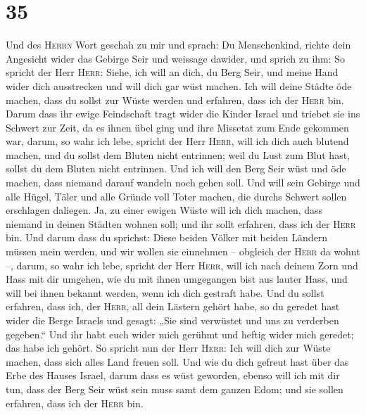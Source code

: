 \hypertarget{section-34}{%
\section{35}\label{section-34}}

 Und des \textsc{Herrn} Wort geschah zu mir und sprach:
 Du Menschenkind, richte dein Angesicht wider das Gebirge
Seir und weissage dawider,  und sprich zu ihm: So spricht
der Herr \textsc{Herr}: Siehe, ich will an dich, du Berg Seir, und meine
Hand wider dich ausstrecken und will dich gar wüst machen.
 Ich will deine Städte öde machen, dass du sollst zur
Wüste werden und erfahren, dass ich der \textsc{Herr} bin.
 Darum dass ihr ewige Feindschaft tragt wider die Kinder
Israel und triebet sie ins Schwert zur Zeit, da es ihnen übel ging und
ihre Missetat zum Ende gekommen war,  darum, so wahr ich
lebe, spricht der Herr \textsc{Herr}, will ich dich auch blutend machen,
und du sollst dem Bluten nicht entrinnen; weil du Lust zum Blut hast,
sollst du dem Bluten nicht entrinnen.  Und ich will den
Berg Seir wüst und öde machen, dass niemand darauf wandeln noch gehen
soll.  Und will sein Gebirge und alle Hügel, Täler und
alle Gründe voll Toter machen, die durchs Schwert sollen erschlagen
daliegen.  Ja, zu einer ewigen Wüste will ich dich machen,
dass niemand in deinen Städten wohnen soll; und ihr sollt erfahren, dass
ich der \textsc{Herr} bin.  Und darum dass du sprichst:
Diese beiden Völker mit beiden Ländern müssen mein werden, und wir
wollen sie einnehmen -- obgleich der \textsc{Herr} da wohnt --,
 darum, so wahr ich lebe, spricht der Herr \textsc{Herr},
will ich nach deinem Zorn und Hass mit dir umgehen, wie du mit ihnen
umgegangen bist aus lauter Hass, und will bei ihnen bekannt werden, wenn
ich dich gestraft habe.  Und du sollst erfahren, dass
ich, der \textsc{Herr}, all dein Lästern gehört habe, so du geredet hast
wider die Berge Israels und gesagt: „Sie sind verwüstet und uns zu
verderben gegeben.``  Und ihr habt euch wider mich
gerühmt und heftig wider mich geredet; das habe ich gehört.
 So spricht nun der Herr \textsc{Herr}: Ich will dich zur
Wüste machen, dass sich alles Land freuen soll.  Und wie
du dich gefreut hast über das Erbe des Hauses Israel, darum dass es wüst
geworden, ebenso will ich mit dir tun, dass der Berg Seir wüst sein muss
samt dem ganzen Edom; und sie sollen erfahren, dass ich der
\textsc{Herr} bin.

